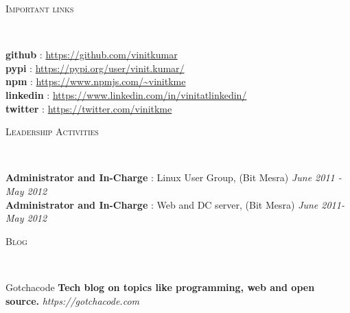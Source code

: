 \documentclass[9pt]{article}
\newenvironment{changemargin}[2]{%
  \begin{list}{}{%
    \setlength{\topsep}{0pt}%
    \setlength{\leftmargin}{#1}%
    \setlength{\rightmargin}{#2}%
    \setlength{\listparindent}{\parindent}%
    \setlength{\itemindent}{\parindent}%
    \setlength{\parsep}{\parskip}%
  }%
  \item[]}{\end{list}
}
\newcommand{\lineover}{
    \begin{changemargin}{-0.05in}{-0.05in}
        \vspace*{-8pt}
        \hrulefill \\
        \vspace*{-2pt}
    \end{changemargin}
}
\newcommand{\header}[1]{
    \begin{changemargin}{-0.5in}{-0.5in}
        \scshape{#1}\\
    \lineover
    \end{changemargin}
}
\newenvironment{body} {
    \vspace*{-16pt}
    \begin{changemargin}{-0.25in}{-0.5in}
  }
    {\end{changemargin}
}
\begin{document}
\smallskip


\header{Important links}

\begin{body}
    \vspace{14pt}
    \textbf{github} :  \url{https://github.com/vinitkumar}\\
    \smallskip
    \textbf{pypi} :  \url{https://pypi.org/user/vinit.kumar/}\\
    \smallskip
    \textbf{npm} : \url{https://www.npmjs.com/~vinitkme}\\
    \smallskip
    \textbf{linkedin} :  \url{https://www.linkedin.com/in/vinitatlinkedin/}\\
    \smallskip
    \textbf{twitter} :  \url{https://twitter.com/vinitkme}\\
\end{body}

\smallskip

\header{Leadership Activities}

\begin{body}
    \vspace{14pt}
    \textbf{Administrator and In-Charge} : Linux User Group, (Bit Mesra) \hfill {} \emph{June 2011 - May 2012}\\
    \smallskip
    \textbf{Administrator and In-Charge} : Web and DC server, (Bit Mesra) \hfill{} \emph{June 2011- May 2012}\\
\end{body}

\smallskip

\header{Blog}

\begin{body}
    \vspace{14pt}
    Gotchacode \textbf{Tech blog on topics like programming, web and open source.} \emph{ https://gotchacode.com}\\
    \smallskip
\end{body}

\smallskip
\end{document}
